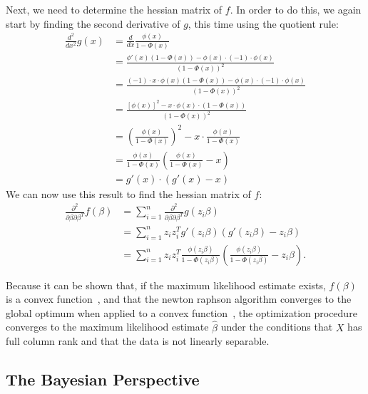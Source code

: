 \noindent Next, we need to determine the hessian matrix of $f$. In order to do this,
we again start by finding the second derivative of $g$, this time
using the quotient rule:
\begin{equation}
    \begin{split}
        \frac{d^2}{dx^2}g(x)
        & = \frac{d}{dx} \frac{\phi(x)}{1 - \Phi(x)} \\
        & = \frac{\phi'(x)(1 - \Phi(x)) - \phi(x) \cdot (-1) \cdot \phi(x)}
        {(1 - \Phi(x))^2} \\
        & = \frac{(-1) \cdot x \cdot \phi(x)(1 - \Phi(x)) - \phi(x) \cdot (-1) \cdot \phi(x)}
        {(1 - \Phi(x))^2} \\
        & = \frac{[\phi(x)]^2 - x \cdot \phi(x) \cdot (1 - \Phi(x))}{(1 - \Phi(x))^2} \\
        & = \left(\frac{\phi(x)}{1 - \Phi(x)}\right)^2 - x \cdot \frac{\phi(x)}{1 - \Phi(x)} \\
        & = \frac{\phi(x)}{1 - \Phi(x)} \left( \frac{\phi(x)}{1 - \Phi(x)} - x \right)  \\
        & = g'(x) \cdot (g'(x) - x)
    \end{split}
\end{equation}
We can now use this result to find the hessian matrix of $f$:
\begin{equation}
    \begin{split}
        \frac{\partial^2}{\partial \beta \partial \beta^T} f(\beta)
        & = \sum_{i=1}^n
        \frac{\partial^2}{\partial \beta \partial \beta^T} g(z_i \beta)\\
        & = \sum_{i=1}^n z_i z_i^T g'(z_i \beta)(g'(z_i \beta) - z_i \beta)\\
        & = \sum_{i=1}^n z_i z_i^T
        \frac{\phi(z_i \beta)}{1 - \Phi(z_i \beta)} \left( \frac{\phi(z_i \beta)}{1 - \Phi(z_i \beta)} - z_i \beta \right).
    \end{split}
\end{equation}

\noindent Because it can be shown that,
if the maximum likelihood estimate exists,
$f(\beta)$ is a convex function~\cite{wedderburn},
and that the newton raphson algorithm converges to
the global optimum when applied to a convex
function~\cite{numerical-optimization},
the optimization procedure converges to the
maximum likelihood estimate $\hat{\beta}$ under the conditions that
$X$ has full column rank and that the data is not linearly separable.

\subsection{The Bayesian Perspective}


